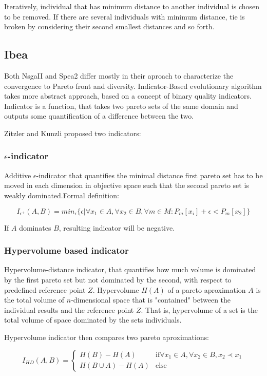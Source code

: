\documentclass[12pt,oneside,draft]{fithesis2}
\begin{document}
Iteratively, individual that has minimum distance to another individual is chosen to be removed. If there are several individuals with minimum distance, tie is broken by considering their second smallest distances and so forth. 

\subsection{Ibea}
Both NsgaII and Spea2 differ mostly in their aproach to characterize the convergence to Pareto front and diversity. 
Indicator-Based evolutionary algorithm takes more abstract approach, based on a concept of binary quality indicators.
Indicator is a function, that takes two pareto sets of the same domain and outputs some quantification of a difference between the two.

Zitzler and Kunzli proposed two indicators:


\subsubsection{$\epsilon$-indicator}   
Additive $\epsilon$-indicator that quantifies the minimal distance first pareto set has to be moved in each dimension in objective space such that the second pareto set is weakly dominated.Formal definition:

$$I_{\epsilon^+}(A,B) = min_\epsilon\{\epsilon |\forall x_1 \in A, \forall x_2 \in B, \forall m \in M: P_m[x_i] + \epsilon < P_m[x_2] \} $$

If $A$ dominates $B$, resulting indicator will be negative.

\subsubsection{Hypervolume based indicator}   
Hypervolume-distance indicator, that quantifies how much volume is dominated by the first pareto set but not dominated by the second, with respect to predefined reference point $Z$. 
Hypervolume $H(A)$ of a pareto aproximation $A$ is the total volume of $n$-dimensional space that is "contained" between the individual results and the reference point $Z$. That is, hypervolume of a set is the total volume of space dominated by the sets individuals.

Hypervolume indicator then compares two pareto aproximations:

$$I_{HD}(A,B) = 
\begin{cases} 
    H(B) - H(A) & \text{if} \forall x_1 \in A, \forall x_2 \in B, x_2 \prec x_1 \\
    H(B \cup A) - H(A) & \text{else}
\end{cases}$$
\end{document}

